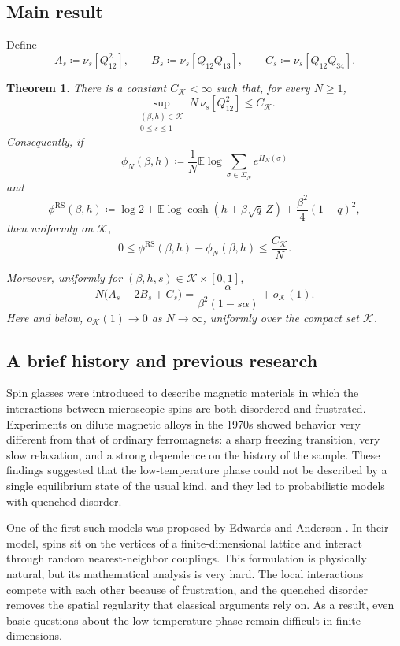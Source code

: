 \documentclass[11pt]{article}
\newtheorem{theorem}{Theorem}[section]
\numberwithin{equation}{section}
\newcommand{\E}{\mathbb{E}}
\newcommand{\1}{\mathbf 1}
\newcommand{\cK}{\mathcal K}
\begin{document}
\subsection{Main result}

Define
\begin{equation}
 A_s\coloneqq\nu_s[Q_{12}^2],\qquad
 B_s\coloneqq\nu_s[Q_{12}Q_{13}],\qquad
 C_s\coloneqq\nu_s[Q_{12}Q_{34}].
 \label{eq:ABC}
\end{equation}

\begin{theorem}
\label{thm:main}
There is a constant $C_{\cK}<\infty$ such that, for every $N\ge1$,
\[
 \sup_{\substack{(\beta,h)\in\cK\\0\le s\le1}}
 N\,\nu_s[Q_{12}^2]\le C_{\cK}.
\]
Consequently, if
\[
 \phi_N(\beta,h)\coloneqq
 \frac1N\E\log\sum_{\sigma\in\Sigma_N}e^{H_N(\sigma)}
\]
and
\[
 \phi^{\mathrm{RS}}(\beta,h)
 \coloneqq
 \log2+\E\log\cosh(h+\beta\sqrt q\,Z)
 +\frac{\beta^2}{4}(1-q)^2,
\]
then uniformly on $\cK$, 
\[ 
 0\le\phi^{\mathrm{RS}}(\beta,h)-\phi_N(\beta,h)
 \le\frac{C_{\cK}}N.
\]


Moreover, uniformly for $(\beta,h,s)\in\cK\times[0,1]$,
\[
 N\bigl(A_s-2B_s+C_s\bigr)
 =
 \frac{\alpha}{\beta^2(1-s\alpha)}+o_{\cK}(1).
\]
Here and below, $o_{\cK}(1)\to0$ as $N\to\infty$, uniformly over the
 compact set $\mathcal K$.
\end{theorem}
\subsection{A brief history and previous research} 
Spin glasses were introduced to describe magnetic materials in which the interactions between microscopic spins are both disordered and frustrated. Experiments on dilute magnetic alloys in the 1970s showed behavior very different from that of ordinary ferromagnets: a sharp freezing transition, very slow relaxation, and a strong dependence on the history of the sample. These findings suggested that the low-temperature phase could not be described by a single equilibrium state of the usual kind, and they led to probabilistic models with quenched disorder.

One of the first such models was proposed by Edwards and Anderson \cite{EdwardsAnderson1975}. In their model, spins sit on the vertices of a finite-dimensional lattice and interact through random nearest-neighbor couplings. This formulation is physically natural, but its mathematical analysis is very hard. The local interactions compete with each other because of frustration, and the quenched disorder removes the spatial regularity that classical arguments rely on. As a result, even basic questions about the low-temperature phase remain difficult in finite dimensions.
\end{document}
